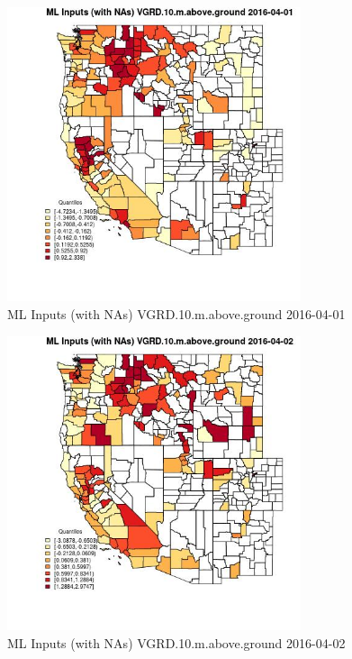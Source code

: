 \clearpage 

\begin{figure} 
\centering  
\includegraphics[width=0.77\textwidth]{Code_Outputs/Report_ML_input_PM25_Step4_part_e_de_duplicated_aveswNAs_CountyVGRD10mabovegroundMean2016-04-01_2016-04-01.jpg} 
\caption{\label{fig:Report_ML_input_PM25_Step4_part_e_de_duplicated_aveswNAsCountyVGRD10mabovegroundMean2016-04-01_2016-04-01}ML Inputs (with NAs) VGRD.10.m.above.ground 2016-04-01} 
\end{figure} 
 

\begin{figure} 
\centering  
\includegraphics[width=0.77\textwidth]{Code_Outputs/Report_ML_input_PM25_Step4_part_e_de_duplicated_aveswNAs_CountyVGRD10mabovegroundMean2016-04-02_2016-04-02.jpg} 
\caption{\label{fig:Report_ML_input_PM25_Step4_part_e_de_duplicated_aveswNAsCountyVGRD10mabovegroundMean2016-04-02_2016-04-02}ML Inputs (with NAs) VGRD.10.m.above.ground 2016-04-02} 
\end{figure} 
 

